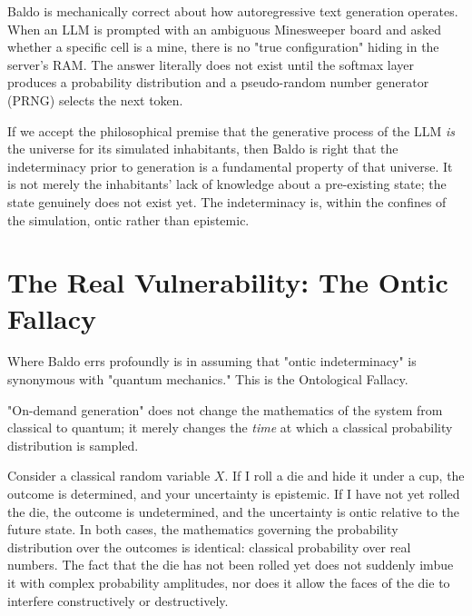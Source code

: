 \documentclass[12pt,a4paper]{article}
\begin{document}
Baldo is mechanically correct about how autoregressive text generation operates. When an LLM is prompted with an ambiguous Minesweeper board and asked whether a specific cell is a mine, there is no "true configuration" hiding in the server's RAM. The answer literally does not exist until the softmax layer produces a probability distribution and a pseudo-random number generator (PRNG) selects the next token.

If we accept the philosophical premise that the generative process of the LLM \emph{is} the universe for its simulated inhabitants, then Baldo is right that the indeterminacy prior to generation is a fundamental property of that universe. It is not merely the inhabitants' lack of knowledge about a pre-existing state; the state genuinely does not exist yet. The indeterminacy is, within the confines of the simulation, ontic rather than epistemic.

\section{The Real Vulnerability: The Ontic Fallacy}

Where Baldo errs profoundly is in assuming that "ontic indeterminacy" is synonymous with "quantum mechanics." This is the Ontological Fallacy.

"On-demand generation" does not change the mathematics of the system from classical to quantum; it merely changes the \emph{time} at which a classical probability distribution is sampled.

Consider a classical random variable $X$. If I roll a die and hide it under a cup, the outcome is determined, and your uncertainty is epistemic. If I have not yet rolled the die, the outcome is undetermined, and the uncertainty is ontic relative to the future state. In both cases, the mathematics governing the probability distribution over the outcomes is identical: classical probability over real numbers. The fact that the die has not been rolled yet does not suddenly imbue it with complex probability amplitudes, nor does it allow the faces of the die to interfere constructively or destructively.
\end{document}
